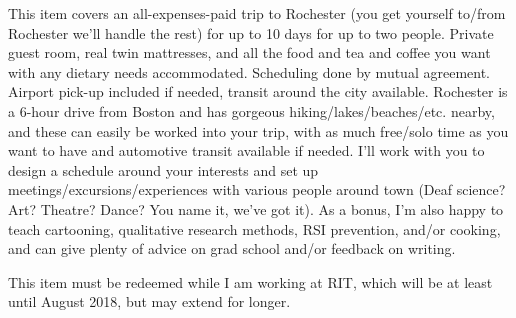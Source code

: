 \documentclass[11pt]{article}
\begin{document}
This item covers an all-expenses-paid trip to Rochester (you get yourself to/from Rochester we'll handle the rest) for up to 10 days for up to two people. Private guest room, real twin mattresses, and all the food and tea and coffee you want with any dietary needs accommodated. Scheduling done by mutual agreement. Airport pick-up included if needed, transit around the city available. Rochester is a 6-hour drive from Boston and has gorgeous hiking/lakes/beaches/etc. nearby, and these can easily be worked into your trip, with as much free/solo time as you want to have and automotive transit available if needed. I'll work with you to design a schedule around your interests and set up meetings/excursions/experiences with various people around town (Deaf science? Art? Theatre? Dance? You name it, we've got it). As a bonus, I'm also happy to teach cartooning, qualitative research methods, RSI prevention, and/or cooking, and can give plenty of advice on grad school and/or feedback on writing.

This item must be redeemed while I am working at RIT, which will be at least until August 2018, but may extend for longer.
\end{document}
